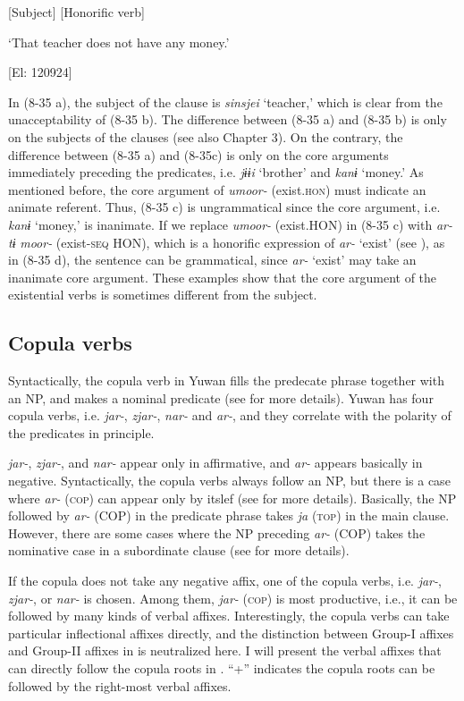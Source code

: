       [Subject]        [Honorific verb]

      ‘That teacher does not have any money.’

      [El: 120924]

In (8-35 a), the subject of the clause is \textit{sinsjei} ‘teacher,’ which is clear from the unacceptability of (8-35 b). The difference between (8-35 a) and (8-35 b) is only on the subjects of the clauses (see also Chapter 3). On the contrary, the difference between (8-35 a) and (8-35c) is only on the core arguments immediately preceding the predicates, i.e. \textit{jɨɨi} ‘brother’ and \textit{kanɨ} ‘money.’ As mentioned before, the core argument of \textit{umoor-} (exist.\textsc{hon}) must indicate an animate referent. Thus, (8-35 c) is ungrammatical since the core argument, i.e. \textit{kanɨ} ‘money,’ is inanimate. If we replace \textit{umoor-} (exist.HON) in (8-35 c) with \textit{ar-tɨ} \textit{moor-} (exist-\textsc{seq} HON), which is a honorific expression of \textit{ar-} ‘exist’ (see ), as in (8-35 d), the sentence can be grammatical, since \textit{ar-} ‘exist’ may take an inanimate core argument. These examples show that the core argument of the existential verbs is sometimes different from the subject.

\subsection{Copula verbs}

Syntactically, the copula verb in Yuwan fills the predecate phrase together with an NP, and makes a nominal predicate (see  for more details). Yuwan has four copula verbs, i.e. \textit{jar-}, \textit{zjar-}, \textit{nar-} and \textit{ar-}, and they correlate with the polarity of the predicates in principle.

  \textit{jar-}, \textit{zjar-}, and \textit{nar-} appear only in affirmative, and \textit{ar-} appears basically in negative. Syntactically, the copula verbs always follow an NP, but there is a case where \textit{ar-} (\textsc{cop}) can appear only by itslef (see  for more details). Basically, the NP followed by \textit{ar-} (COP) in the predicate phrase takes \textit{ja} (\textsc{top}) in the main clause. However, there are some cases where the NP preceding \textit{ar-} (COP) takes the nominative case in a subordinate clause (see  for more details).

  If the copula does not take any negative affix, one of the copula verbs, i.e. \textit{jar-}, \textit{zjar-}, or \textit{nar-} is chosen. Among them, \textit{jar-} (\textsc{cop}) is most productive, i.e., it can be followed by many kinds of verbal affixes. Interestingly, the copula verbs can take particular inflectional affixes directly, and the distinction between Group-I affixes and Group-II affixes in  is neutralized here. I will present the verbal affixes that can directly follow the copula roots in . “+” indicates the copula roots can be followed by the right-most verbal affixes.

